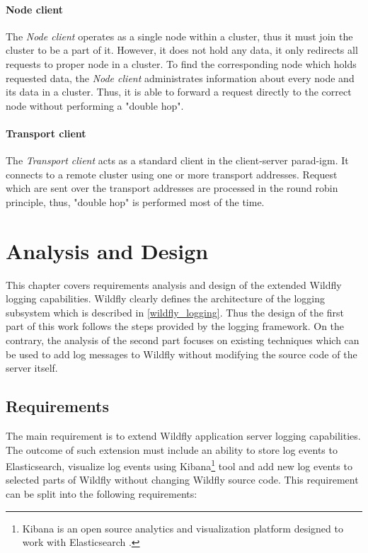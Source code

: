 \documentclass[12pt,oneside]{fithesis2}
\begin{document}
\subsubsection{Node client}
The \textit{Node client} operates as a single node within a cluster, thus it must join the cluster to be a part of it. However, it does not hold any data, it only redirects all requests to proper node in a cluster. To find the corresponding node which holds requested data, the \textit{Node client} administrates information about every node and its data in a cluster. Thus, it is able to forward a request directly to the correct node without performing a "double hop".

\subsubsection{Transport client}
\label{transport_client}
The \textit{Transport client} acts as a standard client in the client-server parad-igm. It connects to a remote cluster using one or more transport addresses. Request which are sent over the transport addresses are processed in the round robin principle, thus, "double hop" is performed most of the time.

\chapter{Analysis and Design}
\label{analysis}
This chapter covers requirements analysis and design of the extended Wildfly logging capabilities. Wildfly clearly defines the architecture of the logging subsystem which is described in \ref{wildfly_logging}. Thus the design of the first part of this work follows the steps provided by the logging framework. On the contrary, the analysis of the second part focuses on existing techniques which can be used to add log messages to Wildfly without modifying the source code of the server itself.

\section{Requirements}
\label{requirements}
The main requirement is to extend Wildfly application server logging capabilities. The outcome of such extension must include an ability to store log events to Elasticsearch, visualize log events using Kibana\footnote{Kibana is an open source analytics and visualization platform designed to work with Elasticsearch \cite{kibana_doc}.} tool and add new log events to selected parts of Wildfly without changing Wildfly source code. This requirement can be split into the following requirements:
\end{document}

